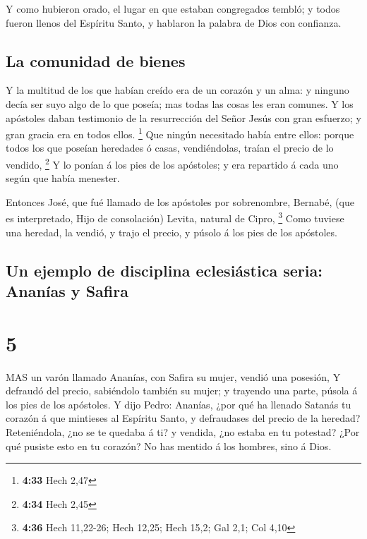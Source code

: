  Y como hubieron orado, el lugar en que estaban congregados
tembló; y todos fueron llenos del Espíritu Santo, y hablaron la palabra
de Dios con confianza.

\hypertarget{la-comunidad-de-bienes}{%
\subsection{La comunidad de bienes}\label{la-comunidad-de-bienes}}

 Y la multitud de los que habían creído era de un corazón y
un alma: y ninguno decía ser suyo algo de lo que poseía; mas todas las
cosas les eran comunes.  Y los apóstoles daban testimonio
de la resurrección del Señor Jesús con gran esfuerzo; y gran gracia era
en todos ellos. \footnote{\textbf{4:33} Hech 2,47}  Que
ningún necesitado había entre ellos: porque todos los que poseían
heredades ó casas, vendiéndolas, traían el precio de lo vendido,
\footnote{\textbf{4:34} Hech 2,45}  Y lo ponían á los pies
de los apóstoles; y era repartido á cada uno según que había menester.

 Entonces José, que fué llamado de los apóstoles por
sobrenombre, Bernabé, (que es interpretado, Hijo de consolación) Levita,
natural de Cipro, \footnote{\textbf{4:36} Hech 11,22-26; Hech 12,25;
  Hech 15,2; Gal 2,1; Col 4,10}  Como tuviese una heredad,
la vendió, y trajo el precio, y púsolo á los pies de los apóstoles.

\hypertarget{un-ejemplo-de-disciplina-eclesiuxe1stica-seria-ananuxedas-y-safira}{%
\subsection{Un ejemplo de disciplina eclesiástica seria: Ananías y
Safira}\label{un-ejemplo-de-disciplina-eclesiuxe1stica-seria-ananuxedas-y-safira}}

\hypertarget{section-4}{%
\section{5}\label{section-4}}

 MAS un varón llamado Ananías, con Safira su mujer, vendió
una posesión,  Y defraudó del precio, sabiéndolo también su
mujer; y trayendo una parte, púsola á los pies de los apóstoles.
 Y dijo Pedro: Ananías, ¿por qué ha llenado Satanás tu
corazón á que mintieses al Espíritu Santo, y defraudases del precio de
la heredad?  Reteniéndola, ¿no se te quedaba á ti? y
vendida, ¿no estaba en tu potestad? ¿Por qué pusiste esto en tu corazón?
No has mentido á los hombres, sino á Dios.

